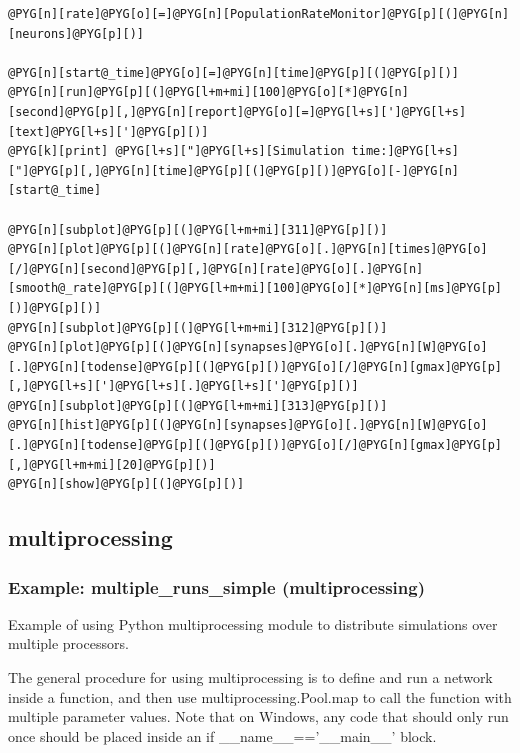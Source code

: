 \documentclass[letterpaper,10pt,english]{manual}
\begin{document}
\begin{Verbatim}[commandchars=@\[\]]
@PYG[n][rate]@PYG[o][=]@PYG[n][PopulationRateMonitor]@PYG[p][(]@PYG[n][neurons]@PYG[p][)]

@PYG[n][start@_time]@PYG[o][=]@PYG[n][time]@PYG[p][(]@PYG[p][)]
@PYG[n][run]@PYG[p][(]@PYG[l+m+mi][100]@PYG[o][*]@PYG[n][second]@PYG[p][,]@PYG[n][report]@PYG[o][=]@PYG[l+s][']@PYG[l+s][text]@PYG[l+s][']@PYG[p][)]
@PYG[k][print] @PYG[l+s]["]@PYG[l+s][Simulation time:]@PYG[l+s]["]@PYG[p][,]@PYG[n][time]@PYG[p][(]@PYG[p][)]@PYG[o][-]@PYG[n][start@_time]

@PYG[n][subplot]@PYG[p][(]@PYG[l+m+mi][311]@PYG[p][)]
@PYG[n][plot]@PYG[p][(]@PYG[n][rate]@PYG[o][.]@PYG[n][times]@PYG[o][/]@PYG[n][second]@PYG[p][,]@PYG[n][rate]@PYG[o][.]@PYG[n][smooth@_rate]@PYG[p][(]@PYG[l+m+mi][100]@PYG[o][*]@PYG[n][ms]@PYG[p][)]@PYG[p][)]
@PYG[n][subplot]@PYG[p][(]@PYG[l+m+mi][312]@PYG[p][)]
@PYG[n][plot]@PYG[p][(]@PYG[n][synapses]@PYG[o][.]@PYG[n][W]@PYG[o][.]@PYG[n][todense]@PYG[p][(]@PYG[p][)]@PYG[o][/]@PYG[n][gmax]@PYG[p][,]@PYG[l+s][']@PYG[l+s][.]@PYG[l+s][']@PYG[p][)]
@PYG[n][subplot]@PYG[p][(]@PYG[l+m+mi][313]@PYG[p][)]
@PYG[n][hist]@PYG[p][(]@PYG[n][synapses]@PYG[o][.]@PYG[n][W]@PYG[o][.]@PYG[n][todense]@PYG[p][(]@PYG[p][)]@PYG[o][/]@PYG[n][gmax]@PYG[p][,]@PYG[l+m+mi][20]@PYG[p][)]
@PYG[n][show]@PYG[p][(]@PYG[p][)]
\end{Verbatim}


\subsection{multiprocessing}

\resetcurrentobjects
\hypertarget{--doc-examples-multiprocessing_multiple_runs_simple}{}

\hypertarget{example-multiprocessing-multiple-runs-simple}{}\subsubsection{Example: multiple\_runs\_simple (multiprocessing)}

Example of using Python multiprocessing module to distribute simulations over
multiple processors.

The general procedure for using multiprocessing is to define and run a network
inside a function, and then use multiprocessing.Pool.map to call the function
with multiple parameter values. Note that on Windows, any code that should only
run once should be placed inside an if \_\_name\_\_=='\_\_main\_\_' block.
\end{document}
